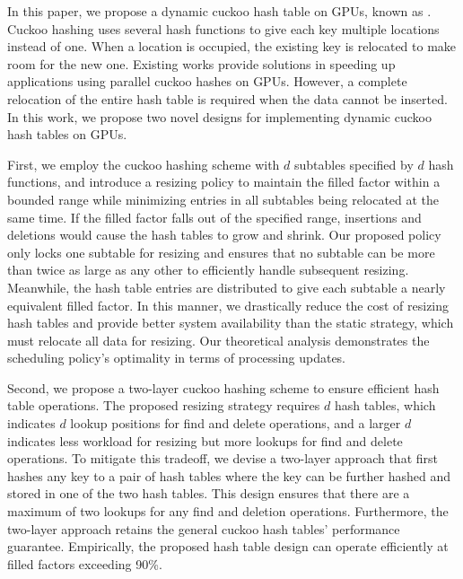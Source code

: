 In this paper, we propose a dynamic cuckoo hash table on GPUs, known as \voter. Cuckoo hashing \cite{pagh2004cuckoo} uses several hash functions to give each key multiple locations instead of one. When a location is occupied, the existing key is relocated to make room for the new one. Existing works \cite{alcantara2009real,alcantara2011building,zhang2015mega,breslow2016horton} provide solutions in speeding up applications using parallel cuckoo hashes on GPUs. 
However, a complete relocation of the entire hash table is required when the data cannot be  inserted.
In this work, we propose two novel designs for implementing dynamic cuckoo hash tables on GPUs.

First, we employ the cuckoo hashing scheme with $d$ subtables specified by $d$ hash functions, and introduce a resizing policy to maintain the filled factor within a bounded range while minimizing entries in all subtables being relocated at the same time. 
If the filled factor falls out of the specified range, insertions and deletions would cause the hash tables to grow and shrink.
Our proposed policy only locks one subtable for resizing and ensures that no subtable can be more than twice as large as any other to efficiently handle subsequent resizing. Meanwhile, the hash table entries are distributed to give each subtable a nearly equivalent filled factor.
In this manner, we drastically reduce the cost of resizing hash tables and provide better system availability than the static strategy, which must relocate all data for resizing.
Our theoretical analysis demonstrates the scheduling policy's optimality in terms of processing updates. 

Second, we propose a two-layer cuckoo hashing scheme to ensure efficient hash table operations. 
The proposed resizing strategy requires $d$ hash tables, which indicates $d$ lookup positions for find and delete operations, and a larger $d$ indicates less workload for resizing but more lookups for find and delete operations. To mitigate this tradeoff, we devise a two-layer approach that first hashes any key to a pair of hash tables where the key can be further hashed and stored in one of the two hash tables.  
This design ensures that there are a maximum of two lookups for any find and deletion operations.
Furthermore, the two-layer approach retains the general cuckoo hash tables' performance guarantee.
Empirically, the proposed hash table design can operate efficiently at filled factors exceeding 90\%.


